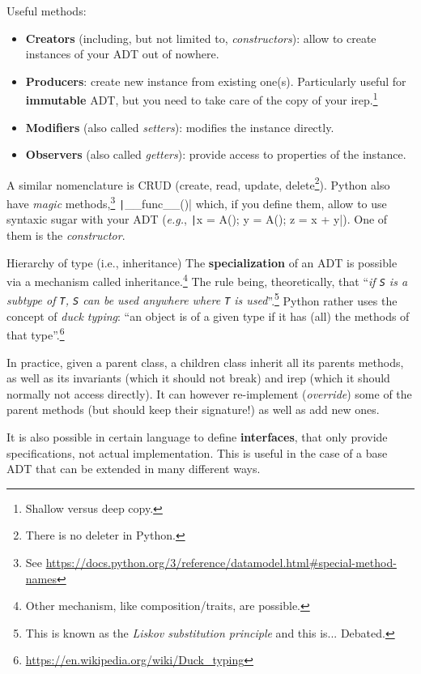 \documentclass[10pt,
aspectratio=169
]{beamer}
\begin{document}
\begin{frame}
	Useful methods:\begin{itemize}
		\item \textbf{Creators} (including, but not limited to, \textit{constructors}): allow to create instances of your ADT out of nowhere.
		\item \textbf{Producers}: create new instance from existing one(s). Particularly useful for \textbf{immutable} ADT, but you need to take care of the copy of your irep.\footnote{Shallow versus deep copy.}
		\item \textbf{Modifiers} (also called \textit{setters}): modifies the instance directly.
		\item \textbf{Observers} (also called \textit{getters}): provide access to properties of the instance.
	\end{itemize}
	A similar nomenclature is CRUD (create, read, update, delete\footnote{There is no deleter in Python.}). Python also have \textit{magic} methods,\footnote{See \url{https://docs.python.org/3/reference/datamodel.html\#special-method-names}} \texttt|__func__()| which, if you define them, allow to use syntaxic sugar with your ADT (\textit{e.g.}, \texttt|x = A(); y = A(); z = x + y|). One of them is the \textit{constructor}.
\end{frame}

\begin{frame}{Hierarchy of type (i.e., inheritance)}
	The \textbf{specialization} of an ADT is possible via a mechanism called inheritance.\footnote{Other mechanism, like composition/traits, are possible.} The rule being, theoretically, that ``\emph{if \texttt{S} is a subtype of \texttt{T}, \texttt{S} can be used anywhere where \texttt{T} is used}''.\footnote{This is known as the \textit{Liskov substitution principle} and this is... Debated.}	
	Python rather uses the concept of \textit{duck typing}: ``an object is of a given type if it has (all) the methods of that type''.\footnote{ \url{https://en.wikipedia.org/wiki/Duck_typing}}
	
	In practice, given a parent class,  a children class inherit all its parents methods, as well as its invariants (which it should not break) and irep (which it should normally not access directly). It can however re-implement (\textit{override}) some of the parent methods (but should keep their signature!) as well as add new ones.
	
	It is also possible in certain language to define \textbf{interfaces}, that only provide specifications, not actual implementation. This is useful in the case of a base ADT that can be extended in many different ways.
\end{frame}
\end{document}
